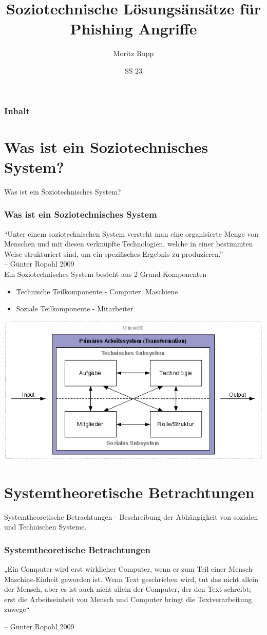 \documentclass{beamer}
\title[Social Engineering]{Soziotechnische Lösungsänsätze für Phishing Angriffe }
\author{Moritz Rupp}
\institute[MR]{Hochschule Albstadt-Sigmaringen}
\date{SS 23}
\begin{document}
\begin{frame}
 \titlepage
\end{frame}
\begin{frame}
 \frametitle{Inhalt}
 \tableofcontents
\end{frame}
\section{Was ist ein Soziotechnisches System?}
\begin{frame}{Was ist ein Soziotechnisches System? }
 \frametitle{Was ist ein Soziotechnisches System}
 ``Unter einem soziotechnischen System versteht man eine organisierte Menge von Menschen und mit diesen verknüpfte Technologien, welche in einer bestimmten Weise strukturiert sind, um ein spezifisches Ergebnis zu produzieren.''\\
 – Günter Ropohl 2009
 \\
 \vspace{10mm}
 Ein Soziotechnisches System besteht aus 2 Grund-Komponenten
 \begin{itemize}
  \item Technische Teilkomponente - Computer, Maschiene
  \item Soziale Teilkomponente - Mitarbeiter
 \end{itemize}
\end{frame}
\begin{frame}
\begin{center}
 \includegraphics[scale=0.5]{data/sozio.png}

\end{center}

\end{frame}
\section{Systemtheoretische Betrachtungen}
\begin{frame}{Systemtheoretische Betrachtungen}
- Beschreibung der Abhängigkeit von sozialen und Technischen Systeme.\\
\vspace{2mm}
 \frametitle{Systemtheoretische Betrachtungen}
 „Ein Computer wird erst wirklicher Computer, wenn er zum Teil einer Mensch-Maschine-Einheit geworden ist. Wenn Text geschrieben wird, tut das nicht allein der Mensch, aber es ist auch nicht allein der Computer, der den Text schreibt; erst die Arbeitseinheit von Mensch und Computer bringt die Textverarbeitung zuwege“
 
 – Günter Ropohl 2009
\end{frame}
\end{document}
